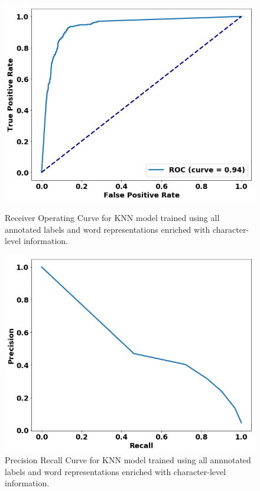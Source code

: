 \begin{figure}
\centering
\begin{minipage}[b]{.4\textwidth}
\includegraphics[trim=0in 0.1in 0.1in 0.in,clip,width=1.0\textwidth]{figures/roc_all.png}
\caption{Receiver Operating Curve for KNN model trained using all annotated labels and word representations enriched with character-level information.}\label{fig:all_rocs_fasttext}
\end{minipage}\qquad
\begin{minipage}[b]{.4\textwidth}
\includegraphics[trim=0in 0.1in 0.1in 0.in,clip,width=1.0\textwidth]{figures/prc_all.png}
\caption{Precision Recall Curve for KNN model trained using all annnotated labels and word representations enriched with character-level information.}\label{fig:all_prcs_fasttext}
\end{minipage}
\end{figure}






